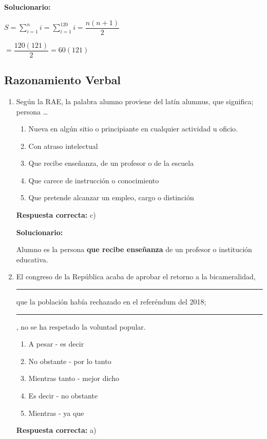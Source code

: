 \begin{enumerate}[resume]
	\vspace{2mm}
	\textbf{Solucionario:}
	
	$S=\sum_{i=1}^{n} i=\sum_{i=1}^{120} i=\dfrac{n(n+1)}{2}$
	
	$=\dfrac{120(121)}{2}=60(121)$
	
	
	\vspace{6mm}
	
\end{enumerate}



\subsection*{Razonamiento Verbal}

\begin{enumerate}[resume]

	
	\item Según la RAE, la palabra alumno proviene del latín alumnus, que significa; persona …
	\begin{enumerate}[label=\alph*)]
		\item Nueva en algún sitio o principiante en cualquier actividad u oficio.
		\item Con atraso intelectual
		\item Que recibe enseñanza, de un profesor o de la escuela
		\item Que carece de instrucción o conocimiento
		\item Que pretende alcanzar un empleo, cargo o distinción
	\end{enumerate}
	\textbf{Respuesta correcta:} c)
	
	\vspace{2mm}
	\textbf{Solucionario:}
	
	Alumno es la persona \textbf{que recibe enseñanza} de un profesor o institución educativa.
	
	\vspace{6mm}
	
	\item El congreso de la República acaba de aprobar el retorno a la bicameralidad, \rule{2cm}{0.4pt} que la población había rechazado en el referéndum del 2018; \rule{2cm}{0.4pt}, no se ha respetado la voluntad popular.
	\begin{enumerate}[label=\alph*)]
		\item A pesar - es decir
		\item No obstante - por lo tanto
		\item Mientras tanto - mejor dicho
		\item Es decir - no obstante
		\item Mientras - ya que
	\end{enumerate}
	\textbf{Respuesta correcta:} a)
	

\end{enumerate}
